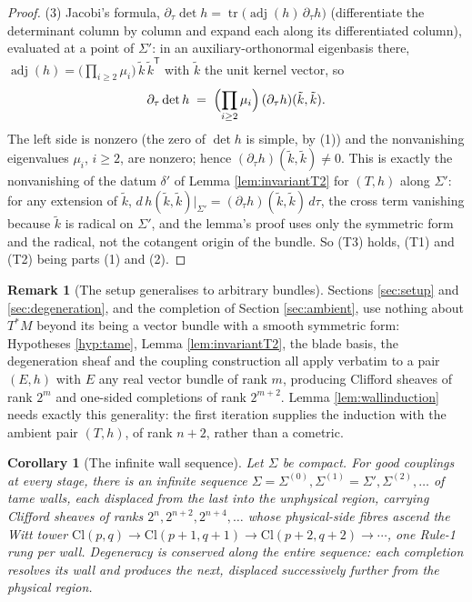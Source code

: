 \documentclass[11pt]{article}
\newtheorem{corollary}[theorem]{Corollary}
\theoremstyle{definition}
\newtheorem{remark}[theorem]{Remark}
\newcommand{\Cl}{\mathrm{Cl}}
\newcommand{\Sig}{\Sigma}
\begin{document}
\begin{proof}
(3) Jacobi's formula, $\partial_\tau \det h = \operatorname{tr}\bigl(\operatorname{adj}(h)\, \partial_\tau h\bigr)$ (differentiate the determinant column by column and expand each along its differentiated column), evaluated at a point of $\Sig'$: in an auxiliary-orthonormal eigenbasis there, $\operatorname{adj}(h) = \bigl(\prod_{i \geq 2} \mu_i\bigr)\, \tilde k\, \tilde k^{\mathsf T}$ with $\tilde k$ the unit kernel vector, so
\[
\partial_\tau \det h \;=\; \Bigl(\prod_{i \geq 2} \mu_i\Bigr)\, (\partial_\tau h)(\tilde k, \tilde k) .
\]
The left side is nonzero (the zero of $\det h$ is simple, by (1)) and the nonvanishing eigenvalues $\mu_i$, $i \geq 2$, are nonzero; hence $(\partial_\tau h)(\tilde k, \tilde k) \neq 0$. This is exactly the nonvanishing of the datum $\delta'$ of Lemma \ref{lem:invariantT2} for $(T, h)$ along $\Sig'$: for any extension of $\tilde k$, $d\,h(\tilde k, \tilde k)|_{\Sig'} = (\partial_\tau h)(\tilde k, \tilde k)\, d\tau$, the cross term vanishing because $\tilde k$ is radical on $\Sig'$, and the lemma's proof uses only the symmetric form and the radical, not the cotangent origin of the bundle. So (T3) holds, (T1) and (T2) being parts (1) and (2).
\end{proof}

\begin{remark}[The setup generalises to arbitrary bundles]\label{rem:bundlesetup}
Sections \ref{sec:setup} and \ref{sec:degeneration}, and the completion of Section \ref{sec:ambient}, use nothing about $T^*M$ beyond its being a vector bundle with a smooth symmetric form: Hypotheses \ref{hyp:tame}, Lemma \ref{lem:invariantT2}, the blade basis, the degeneration sheaf and the coupling construction all apply verbatim to a pair $(E, h)$ with $E$ any real vector bundle of rank $m$, producing Clifford sheaves of rank $2^m$ and one-sided completions of rank $2^{m+2}$. Lemma \ref{lem:wallinduction} needs exactly this generality: the first iteration supplies the induction with the ambient pair $(T, h)$, of rank $n+2$, rather than a cometric.
\end{remark}

\begin{corollary}[The infinite wall sequence]\label{cor:wallsequence}
Let $\Sig$ be compact. For good couplings at every stage, there is an infinite sequence $\Sig = \Sig^{(0)}, \Sig^{(1)} = \Sig', \Sig^{(2)}, \dots$ of tame walls, each displaced from the last into the unphysical region, carrying Clifford sheaves of ranks $2^n, 2^{n+2}, 2^{n+4}, \dots$ whose physical-side fibres ascend the Witt tower $\Cl(p,q) \to \Cl(p{+}1,q{+}1) \to \Cl(p{+}2,q{+}2) \to \cdots$, one Rule-1 rung per wall. Degeneracy is conserved along the entire sequence: each completion resolves its wall and produces the next, displaced successively further from the physical region.
\end{corollary}
\end{document}
